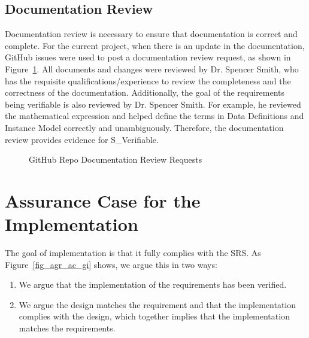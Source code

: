 \subsection{Documentation Review}

Documentation review is necessary to ensure that documentation is correct and complete. For the current project,  when there is an update in the documentation, GitHub issues were used to post a documentation review request, as shown in Figure~\ref{fig_agr_doc_review}. All documents and changes were reviewed by Dr. Spencer Smith, who has the requisite qualifications/experience to review the completeness and the correctness of the documentation. Additionally, the goal of the requirements being verifiable is also reviewed by Dr. Spencer Smith. For example, he reviewed the mathematical expression and helped define the terms in Data Definitions and Instance Model correctly and unambiguously. Therefore, the documentation review provides evidence for S\_Verifiable.

\begin{figure}[H]
    \centering
    \caption[GitHub Repo Documentation Review Requests]{GitHub Repo Documentation Review Requests}
    \label{fig_agr_doc_review}
\end{figure}


\section{Assurance Case for the Implementation}
The goal of implementation is that it fully complies with the SRS. As Figure~\ref{fig_agr_ac_gi} shows, we argue this in two ways:

\begin{enumerate}
  \item We argue that the implementation of the requirements has been verified.
  \item We argue the design matches the requirement and that the implementation complies with the design, which together implies that the implementation matches the requirements.
\end{enumerate}

